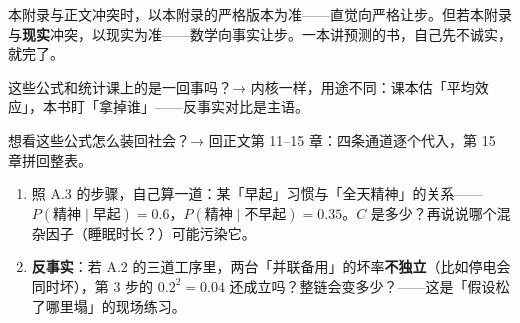 \documentclass[../../main2.tex]{subfiles}
\begin{document}
\begin{warningbox}
	本附录与正文冲突时，以本附录的严格版本为准——直觉向严格让步。但若本附录与\textbf{现实}冲突，以现实为准——数学向事实让步。一本讲预测的书，自己先不诚实，就完了。
\end{warningbox}

\begin{reader_anticipation}
	\item 这些公式和统计课上的是一回事吗？→ 内核一样，用途不同：课本估「平均效应」，本书盯「拿掉谁」——反事实对比是主语。
	\item 想看这些公式怎么装回社会？→ 回正文第 11–15 章：四条通道逐个代入，第 15 章拼回整表。
\end{reader_anticipation}

\begin{thinkbox}
\begin{enumerate}
	\item 照 A.3 的步骤，自己算一道：某「早起」习惯与「全天精神」的关系——$P(\text{精神} \mid \text{早起}) = 0.6$，$P(\text{精神} \mid \text{不早起}) = 0.35$。$C$ 是多少？再说说哪个混杂因子（睡眠时长？）可能污染它。
	\item \textbf{反事实}：若 A.2 的三道工序里，两台「并联备用」的坏率\textbf{不独立}（比如停电会同时坏），第 3 步的 $0.2^2 = 0.04$ 还成立吗？整链会变多少？——这是「假设松了哪里塌」的现场练习。
\end{enumerate}
\end{thinkbox}
\end{document}
